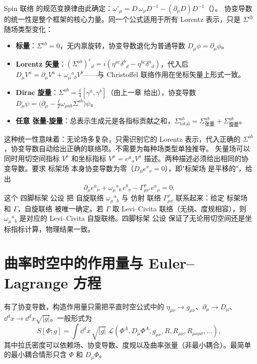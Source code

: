 Spin 联络 的规范变换律由此确定：$\omega'_\mu=D\,\omega_\mu D^{-1}-(\partial_\mu D)D^{-1}$（）。
协变导数 的统一性是整个框架的核心力量。同一个公式适用于所有 Lorentz 表示，只是 $\Sigma^{ab}$ 随场类型变化：

\begin{itemize}
\item \textbf{标量}：$\Sigma^{ab}=0$，无内禀旋转，协变导数退化为普通导数 $D_\mu\phi=\partial_\mu\phi$。
\item \textbf{Lorentz 矢量}：$(\Sigma^{ab})^c{}_d=i(\eta^{ac}\delta^b{}_d-\eta^{bc}\delta^a{}_d)$，代入后 $D_\mu V^a=\partial_\mu V^a+\omega_\mu{}^a{}_b V^b$——与 Christoffel 联络作用在坐标矢量上形式一致。
\item \textbf{Dirac 旋量}：$\Sigma^{ab}=\frac{\ii}{4}[\gamma^a,\gamma^b]$（由上一章 给出），协变导数 $D_\mu\psi=\big(\partial_\mu-\frac{\ii}{2}\omega_{\mu ab}\Sigma^{ab}\big)\psi$。
\item \textbf{任意 张量-旋量}：总表示生成元是各指标贡献之和，$\Sigma^{ab}_{\text{total}}=\Sigma^{ab}_{\text{张量}}+\Sigma^{ab}_{\text{旋量}}$。
\end{itemize}

这种统一性意味着：无论场多复杂，只需识别它的 Lorentz 表示，代入正确的 $\Sigma^{ab}$，协变导数自动给出正确的联络项。不需要为每种场类型单独推导。
矢量场可以同时用切空间指标 $V^a$ 和坐标指标 $V^\mu=e^\mu{}_a V^a$ 描述。两种描述必须给出相同的协变导数。要求 标架场 本身协变导数为零（$D_\mu e^a{}_\nu=0$），即"标架场 是平移的"，给出
\begin{equation*}{
\partial_\mu e^a{}_\nu+\omega_\mu{}^a{}_b\,e^b{}_\nu-\Gamma^\rho_{\mu\nu}\,e^a{}_\rho=0.
}
\end{equation*}
这个 四脚标架 公设 把 自旋联络 $\omega_\mu{}^a{}_b$ 与 仿射 联络 $\Gamma^\rho_{\mu\nu}$ 联系起来：给定 标架场 和 $\Gamma$，自旋联络 被唯一确定。若 $\Gamma$ 取 Levi--Civita 联络（无挠、度规相容），则 $\omega_\mu{}^a{}_b$ 是对应的 Levi--Civita 自旋联络。四脚标架 公设 保证了无论用切空间还是坐标指标计算，物理结果一致。

\section{曲率时空中的作用量与 Euler--Lagrange 方程}

有了协变导数，构造作用量只需把平直时空公式中的 $\eta_{\mu\nu}\to g_{\mu\nu}$、$\partial_\mu\to D_\mu$、$\dd^dx\to \dd^dx\sqrt{|g|}$。一般形式为
\begin{equation}\label{eq:ms-curved-action}
{
S[\Phi;g]=\int \dd^dx\,\sqrt{|g|}\;\mathcal{L}(\Phi^A,D_\mu\Phi^A,g_{\mu\nu},R,R_{\mu\nu},R_{\mu\nu\rho\sigma},\ldots),
}
\end{equation}
其中拉氏密度可以依赖场、协变导数、度规以及曲率张量（非最小耦合）。最简单的最小耦合情形只含 $\Phi$ 和 $D_\mu\Phi$。


